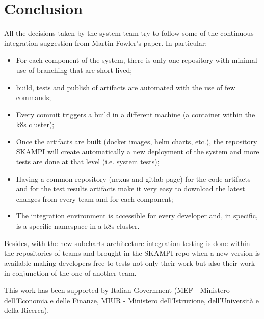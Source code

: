 \documentclass[a4paper]{spie}  %
\begin{document}
\section{Conclusion}
All the decisions taken by the system team try to follow some of the continuous integration suggestion from Martin Fowler’s paper. In particular:
\begin{itemize}
    \item For each component of the system, there is only one repository with minimal use of branching that are short lived;
    \item build, tests and publish of artifacts are automated with the use of few commands;
    \item Every commit triggers a build in a different machine (a container within the k8s cluster);
    \item Once the artifacts are built (docker images, helm charts, etc.), the repository SKAMPI will create automatically a new deployment of the system and more tests are done at that level (i.e. system tests);
    \item Having a common repository (nexus and gitlab page) for the code artifacts and for the test results artifacts make it very easy to download the latest changes from every team and for each component;
    \item The integration environment is accessible for every developer and, in specific, is a specific namespace in a k8s cluster.
\end{itemize}

Besides, with the new subcharts architecture integration testing is done within the repositories of teams and brought in the SKAMPI repo when a new version is available making developers free to tests not only their work but also their work in conjunction of the one of another team. 

\acknowledgments %
 
This work has been supported by Italian Government (MEF - Ministero dell'Economia e delle Finanze, MIUR - Ministero dell'Istruzione, dell'Università e della Ricerca).

\end{document}
